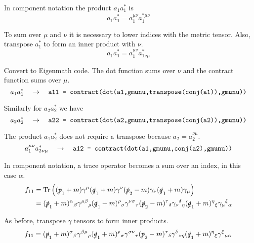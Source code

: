\documentclass[12pt]{article}
\begin{document}
In component notation the product $a_1a_1^*$ is
\begin{equation*}
a_1a_1^*=a_1^{\mu\nu}a_1^{*\mu\nu}
\end{equation*}

To sum over $\mu$ and $\nu$ it is necessary to lower indices with the metric tensor.
Also, transpose $a_1^*$ to form an inner product with $\nu$.
\begin{equation*}
a_1a_1^*=a_1^{\mu\nu}a_{1\nu\mu}^*
\end{equation*}

Convert to Eigenmath code.
The dot function sums over $\nu$ and the contract function sums over $\mu$.
\begin{equation*}
a_1a_1^*
\quad\rightarrow\quad
\text{\tt a11 = contract(dot(a1,gmunu,transpose(conj(a1)),gmunu))}
\end{equation*}

Similarly for $a_2a_2^*$ we have
\begin{equation*}
a_2a_2^*
\quad\rightarrow\quad
\text{\tt a22 = contract(dot(a2,gmunu,transpose(conj(a2)),gmunu))}
\end{equation*}

The product $a_1a_2^*$ does not require a transpose because $a_2=a_2^{\nu\mu}$.
\begin{equation*}
a_1^{\mu\nu}a_{2\nu\mu}^*
\quad\rightarrow\quad
\text{\tt a12 = contract(dot(a1,gmunu,conj(a2),gmunu))}
\end{equation*}

In component notation, a trace operator becomes a sum over an index, in this case $\alpha$.
\begin{align*}
f_{11}
&=
\mathop{\rm Tr}
\left(
(\slashed{p}_1+m)\gamma^\mu(\slashed{q}_1+m)\gamma^\nu(\slashed{p}_2-m)\gamma_\nu(\slashed{q}_1+m)\gamma_\mu
\right)\\
&=
(\slashed{p}_1+m)^\alpha{}_\beta
\gamma^{\mu\beta}{}_\rho
(\slashed{q}_1+m)^\rho{}_\sigma
\gamma^{\nu\sigma}{}_\tau
(\slashed{p}_2-m)^\tau{}_\delta
\gamma_\nu{}^\delta{}_\eta
(\slashed{q}_1+m)^\eta{}_\xi
\gamma_\mu{}^\xi{}_\alpha
\end{align*}

As before, transpose $\gamma$ tensors to form inner products.
\begin{equation*}
f_{11}=
(\slashed{p}_1+m)^\alpha{}_\beta
\gamma^{\beta\mu}{}_\rho
(\slashed{q}_1+m)^\rho{}_\sigma
\gamma^{\sigma\nu}{}_\tau
(\slashed{p}_2-m)^\tau{}_\delta
\gamma^\delta{}_{\nu\eta}
(\slashed{q}_1+m)^\eta{}_\xi
\gamma^\xi{}_{\mu\alpha}
\end{equation*}
\end{document}
